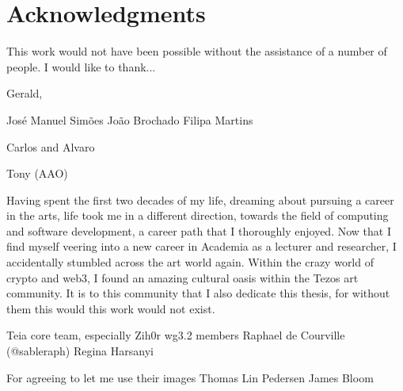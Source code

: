 \chapter*{Acknowledgments}

\todo

This work would not have been possible without the assistance of a number of people. I would like to thank...

Gerald,

José Manuel Simões
João Brochado
Filipa Martins

Carlos and Alvaro

Tony (AAO)


Having spent the first two decades of my life, dreaming about pursuing a career in the arts, life took me in a different direction, towards the field of computing and software development, a career path that I thoroughly enjoyed. Now that I find myself veering into a new career in Academia as a lecturer and researcher, I accidentally stumbled across the art world again. Within the crazy world of crypto and web3, I found an amazing cultural oasis within the Tezos art community. It is to this community that I also dedicate this thesis, for without them this would this work would not exist. 


Teia core team, especially Zih0r
wg3.2 members
Raphael de Courville (@sableraph)
Regina Harsanyi

For agreeing to let me use their images
Thomas Lin Pedersen
James Bloom



